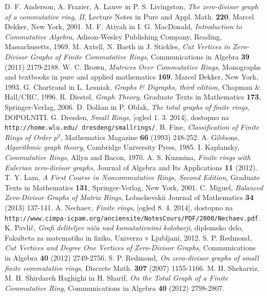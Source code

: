 \documentclass[a4paper, 12pt]{amsart}
\theoremstyle{definition} %
\theoremstyle{plain} %
\begin{document}
\begin{thebibliography}{99}
 D. F. Anderson, A. Frazier, A. Lauve in P. S. Livingston, \emph{The zero-divisor graph of a commutative ring, II}, Lecture Notes in Pure and Appl. Math. {\bf 220}, Marcel Dekker, New York, 2001.
M. F. Atiyah in I. G. MacDonald, \emph{Introduction to Commutative Algebra}, Adison-Wesley Publishing Company, Reading, Massachusetts, 1969.
 M. Axtell, N. Baeth in J. Stickles, \emph{Cut Vertices in Zero-Divisor Graphs of Finite Commutative Rings}, Communications in Algebra {\bf 39} (2011) 2179-2188.
 W. C. Brown, \emph{Matrices Over Commutative Rings}, Monographs and textbooks in pure and applied mathematics {\bf 169}, Marcel Dekker, New York, 1993.
G. Chartrand in L. Lesniak, \emph{Graphs \& Digraphs, third edition}, Chapman \& Hall/CRC,  1996.
R. Diestel, \emph{Graph Theory}, Graduate Texts in Mathematics {\bf 173}, Springer-Verlag, 2006.
 D. Dolžan in P. Oblak, \emph{The total graphs of finite rings}, DOPOLNITI.
 G. Dresden, \emph{Small Rings}, [ogled 1. 3. 2014], dostopno na \texttt{http://home.wlu.edu/~dresdeng/smallrings/}.
B. Fine, \emph{Classification of Finite Rings of Order $p^2$}, Mathematics Magazine {\bf 66} (1993) 248-252. 
A. Gibbons, \emph{Algorithmic graph theory}, Cambridge University Press, 1985.
I. Kaplansky, \emph{Commutative Rings}, Allyn and Bacon, 1970.
A. S. Kuzmina, \emph{Finite rings with Eulerian zero-divisor graphs}, Journal of Algebra and Its Applications {\bf 11} (2012).
 T. Y. Lam, \emph{A First Course in Noncommutative Rings, Second Edition}, Graduate Texts in Mathematics {\bf 131}, Springer-Verlag, New York, 2001.
C. Miguel, \emph{Balanced Zero-Divisor Graphs of Matrix Rings}, Lobachevskii Journal of Mathematics {\bf 34} (2013) 137-141.
 A. Nechaev, \emph{Finite rings}, [ogled 8. 4. 2014], dostopno na \texttt{http://www.cimpa-icpam.org/anciensite/NotesCours/PDF/2008/Nechaev.pdf}.
K. Pavlič, \emph{Grafi deliteljev niča nad komutativnimi kolobarji}, diplomsko delo, Fakulteta za matematiko in fiziko, Univerza v Ljubljani, 2012.
 S. P. Redmond, \emph{Cut Vertices and Degree One Vertices of Zero-Divisor Graphs}, Communications in Algebra {\bf 40} (2012) 2749-2756.
 S. P. Redmond, \emph{On zero-divisor graphs of small finite commutative rings}, Discrete Math. {\bf 307} (2007) 1155-1166.
 M. H. Shekarriz, M. H. Shirdareh Haghighi in H.  Sharif, \emph{On the Total Graph of a Finite Commutative Ring}, Communications in Algebra {\bf 40} (2012) 2798-2807.
\end{thebibliography}
\end{document}

